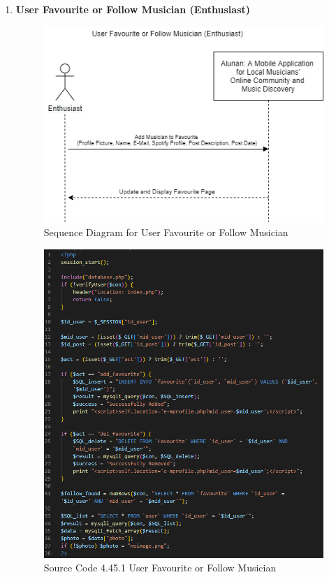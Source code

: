 \begin{enumerate}[1.]
    \item \textbf{User Favourite or Follow Musician (Enthusiast)}
    \begin{figure}[h]
        \centering
        \includegraphics[width=0.7\linewidth]{mainmatter/images/systemint/sifavmusician.png}
        \caption{Sequence Diagram for User Favourite or Follow Musician}
        \label{fig:myfig81}
    \end{figure}
    \begin{figure}[h]\ContinuedFloat
        \centering
        \includegraphics[width=0.7\linewidth]{mainmatter/images/systemint/codefav.png}
        \caption*{Source Code 4.45.1 User Favourite or Follow Musician}
        \label{fig:myfig81a}
    \end{figure}
\end{enumerate}

\clearpage

